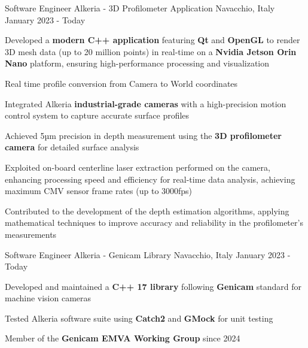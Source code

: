 

\begin{cventries}

  \cventry
    {Software Engineer} %
    {Alkeria - 3D Profilometer Application} %
    {Navacchio, Italy} %
    {January 2023 - Today} %
    {
      \begin{cvitems} %
        \item {Developed a \textbf{modern C++ application} featuring \textbf{Qt} and \textbf{OpenGL} to render 3D mesh data (up to 20 million points) in real-time on a \textbf{Nvidia Jetson Orin Nano} platform, ensuring high-performance processing and visualization}
        \item {Real time profile conversion from Camera to World coordinates}
        \item {Integrated Alkeria \textbf{industrial-grade cameras} with a high-precision motion control system to capture accurate surface profiles}
        \item {Achieved 5µm precision in depth measurement using the \textbf{3D profilometer camera} for detailed surface analysis}
        \item {Exploited on-board centerline laser extraction performed on the camera, enhancing processing speed and efficiency for real-time data analysis, achieving maximum CMV sensor frame rates (up to 3000fps)}
        \item {Contributed to the development of the depth estimation algorithms, applying mathematical techniques to improve accuracy and reliability in the profilometer's measurements}
      \end{cvitems}
    }

  \cventry
    {Software Engineer} %
    {Alkeria - Genicam Library} %
    {Navacchio, Italy} %
    {January 2023 - Today} %
    {
      \begin{cvitems} %
        \item {Developed and maintained a \textbf{C++ 17 library} following \textbf{Genicam} standard for machine vision cameras}
        \item {Tested Alkeria software suite using \textbf{Catch2} and \textbf{GMock} for unit testing}
        \item {Member of the \textbf{Genicam EMVA Working Group} since 2024}
      \end{cvitems}
    }



\end{cventries}
